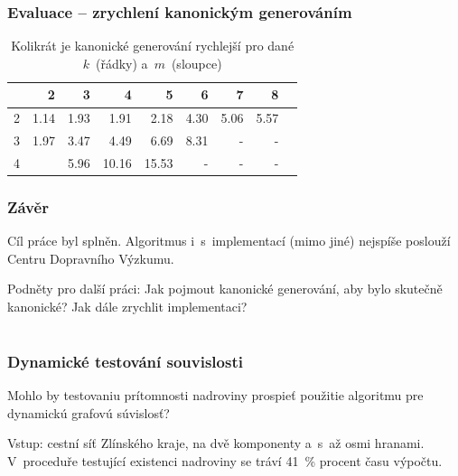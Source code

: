 \documentclass[10pt]{beamer}
\newcommand{\evenrowcolor}{\rowcolor[gray]{0.925}}
\begin{document}
\begin{frame}
	\frametitle{Evaluace -- zrychlení kanonickým generováním}

\begin{table}[H]
	\caption{Kolikrát je kanonické generování rychlejší pro dané $k$~(řádky) a~$m$~(sloupce)}
	\centering
	\begin{tabular}{c|rrrrrrrr}

\toprule

   &         2 &         3 &         4 &         5 &         6 &     7 &     8 \\ \midrule
2  &      1.14 &      1.93 &      1.91 &      2.18 &      4.30 &  5.06 &  5.57 \\
\evenrowcolor
3  &      1.97 &      3.47 &      4.49 &      6.69 &      8.31 &     - &     - \\
4  &           &      5.96 &     10.16 &     15.53 &         - &     - &     - \\

	\end{tabular}
\end{table}

\end{frame}

\begin{frame}
	\frametitle{Závěr}

	Cíl práce byl splněn. Algoritmus i~s~implementací (mimo jiné) nejspíše poslouží Centru Dopravního Výzkumu.
\\
\bigskip

Podněty pro další práci: Jak pojmout kanonické generování, aby bylo skutečně kanonické? Jak dále zrychlit implementaci?


\end{frame}

\section{}

\begin{frame}
	\frametitle{Dynamické testování souvislosti}

	\begin{block}{Mohlo by testovaniu prítomnosti nadroviny prospieť použitie algoritmu pre dynamickú grafovú súvislosť?}

	Vstup: cestní síť Zlínského kraje, na dvě komponenty a~s~až osmi hranami. V~proceduře testující existenci nadroviny se tráví 41~\% procent času výpočtu.

	\end{block}

\end{frame}
\end{document}
